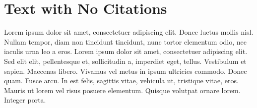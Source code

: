 \documentclass{article}
\begin{document}
\section*{Text with No Citations} 
Lorem ipsum dolor sit amet, consectetuer adipiscing elit. Donec luctus mollis
nisl. Nullam tempor, diam non tincidunt tincidunt, nunc tortor elementum odio,
nec iaculis urna leo a eros. Lorem ipsum dolor sit amet, consectetuer adipiscing
elit. Sed elit elit, pellentesque et, sollicitudin a, imperdiet eget, tellus.
Vestibulum et sapien. Maecenas libero. Vivamus vel metus in ipsum ultricies
commodo. Donec quam. Fusce arcu. In est felis, sagittis vitae, vehicula ut,
tristique vitae, eros. Mauris ut lorem vel risus posuere elementum. Quisque
volutpat ornare lorem. Integer porta.

\nocite{*}

 

\end{document}
